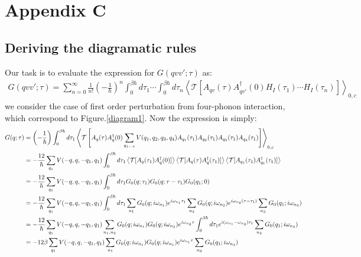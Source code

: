 \documentclass{article}
\begin{document}
\pagebreak
\section*{Appendix C}
\subsection*{Deriving the diagramatic rules}
Our task is to evaluate the expression for $G(qvv';\tau)$ as:
\begin{align}
    G(qvv';\tau)= \sum_{n=0}^{\infty} \frac{1}{n!} \left( -\frac{1}{\hbar} \right)^{n} 
    \int_0^{\beta\hbar} d\tau_1 \cdots \int_0^{\beta\hbar} d\tau_{n} \left\langle \mathcal{T}[ A_{qv}(\tau) A_{qv'}^{\dagger}(0) H_I(\tau_1) \cdots H_I(\tau_{n}) ] \right\rangle_{0,c} 
\end{align}
we consider the case of first order perturbation from four-phonon interaction, which correspond to Figure.\ref{diagram1}. Now the 
expression is simply:
\begin{align}
    G(q;\tau)&= \left( -\frac{1}{\hbar} \right) 
    \int_0^{\beta\hbar} d\tau_1 \left\langle \mathcal{T}\left[ A_{q}(\tau) A_{q}^{\dagger}(0) \sum_{q_{1\cdots 4}}V(q_1,q_2,q_3,q_4) A_{q_1}(\tau_1)A_{q_2}(\tau_1)A_{q_3}(\tau_1)A_{q_4}(\tau_1)\right] \right\rangle_{0,c} \notag \\
    &= -\frac{12}{\hbar}  
    \sum_{q_1} V(-q,q,-q_1,q_1) \int_0^{\beta\hbar} d\tau_1 \left\langle \mathcal{T}[ A_q(\tau_1)A_{q}^{\dagger}(0) ] \right\rangle
    \left\langle \mathcal{T}[ A_{q}(\tau)A_{q}^{\dagger}(\tau_1) ] \right\rangle 
    \left\langle \mathcal{T}[ A_{q_1}(\tau_1)A_{q_1}^{\dagger}(\tau_1) ] \right\rangle \notag \\
    &= -\frac{12}{\hbar} \sum_{q_1} V(-q,q,-q_1,q_1) \int_0^{\beta\hbar} d\tau_1 G_0(q;\tau_1) G_0(q;\tau-\tau_1) G_0(q_1;0) \notag \\
    &= -\frac{12}{\hbar} \sum_{q_1} V(-q,q,-q_1,q_1) \int_0^{\beta\hbar} d\tau_1 
        \sum_{n_1}G_0(q;i\omega_{n_1}) e^{i\omega_{n_1}\tau_1} 
        \sum_{n_2}G_0(q;i\omega_{n_2}) e^{i\omega_{n_2}(\tau-\tau_1)} 
        \sum_{n_3}G_0(q_1;i\omega_{n_3}) \notag \\
    &= -\frac{12}{\hbar} \sum_{q_1} V(-q,q,-q_1,q_1) \sum_{n_1,n_2} G_0(q;i\omega_{n_1}) G_0(q;i\omega_{n_2}) e^{i\omega_{n_2}\tau} 
        \int_0^{\beta\hbar} d\tau_1 e^{i(\omega_{n_1}-\omega_{n_2})\tau_1} \sum_{n_3}G_0(q_1;i\omega_{n_3}) \notag \\
    &= -12\beta \sum_{q_1} V(-q,q,-q_1,q_1) \sum_{n_1} G_0(q;i\omega_{n_1}) G_0(q;i\omega_{n_1}) e^{i\omega_{n_1}\tau} 
        \sum_{n_3}G_0(q_1;i\omega_{n_3})
\end{align}
\end{document}
